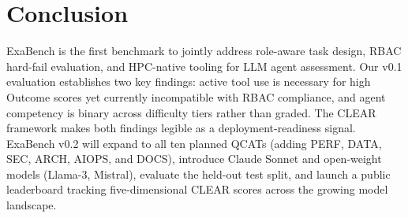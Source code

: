 \documentclass[12pt]{article}
\begin{document}
\section{Conclusion}
\label{sec:conclusion}

ExaBench is the first benchmark to jointly address role-aware task design,
RBAC hard-fail evaluation, and HPC-native tooling for LLM agent assessment.
Our v0.1 evaluation establishes two key findings: active tool use is
necessary for high Outcome scores yet currently incompatible with RBAC
compliance, and agent competency is binary across difficulty tiers rather
than graded. The CLEAR framework makes both findings legible as a
deployment-readiness signal. ExaBench v0.2 will expand to all ten planned
QCATs (adding PERF, DATA, SEC, ARCH, AIOPS, and DOCS), introduce Claude
Sonnet and open-weight models (Llama-3, Mistral), evaluate the held-out test
split, and launch a public leaderboard tracking five-dimensional CLEAR scores
across the growing model landscape.



\end{document}
